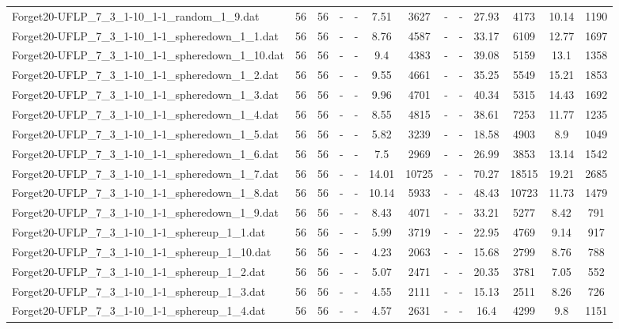 \begin{table}[!ht]
{\begin{tabular}{lcccccccccccc}
Forget20-UFLP\_7\_3\_1-10\_1-1\_random\_1\_9.dat & 56 & 56 &  - &  - & 7.51 & 3627 &  - &  - & 27.93 & 4173 & 10.14 & 1190 \\
Forget20-UFLP\_7\_3\_1-10\_1-1\_spheredown\_1\_1.dat & 56 & 56 &  - &  - & 8.76 & 4587 &  - &  - & 33.17 & 6109 & 12.77 & 1697 \\
Forget20-UFLP\_7\_3\_1-10\_1-1\_spheredown\_1\_10.dat & 56 & 56 &  - &  - & 9.4 & 4383 &  - &  - & 39.08 & 5159 & 13.1 & 1358 \\
Forget20-UFLP\_7\_3\_1-10\_1-1\_spheredown\_1\_2.dat & 56 & 56 &  - &  - & 9.55 & 4661 &  - &  - & 35.25 & 5549 & 15.21 & 1853 \\
Forget20-UFLP\_7\_3\_1-10\_1-1\_spheredown\_1\_3.dat & 56 & 56 &  - &  - & 9.96 & 4701 &  - &  - & 40.34 & 5315 & 14.43 & 1692 \\
Forget20-UFLP\_7\_3\_1-10\_1-1\_spheredown\_1\_4.dat & 56 & 56 &  - &  - & 8.55 & 4815 &  - &  - & 38.61 & 7253 & 11.77 & 1235 \\
Forget20-UFLP\_7\_3\_1-10\_1-1\_spheredown\_1\_5.dat & 56 & 56 &  - &  - & 5.82 & 3239 &  - &  - & 18.58 & 4903 & 8.9 & 1049 \\
Forget20-UFLP\_7\_3\_1-10\_1-1\_spheredown\_1\_6.dat & 56 & 56 &  - &  - & 7.5 & 2969 &  - &  - & 26.99 & 3853 & 13.14 & 1542 \\
Forget20-UFLP\_7\_3\_1-10\_1-1\_spheredown\_1\_7.dat & 56 & 56 &  - &  - & 14.01 & 10725 &  - &  - & 70.27 & 18515 & 19.21 & 2685 \\
Forget20-UFLP\_7\_3\_1-10\_1-1\_spheredown\_1\_8.dat & 56 & 56 &  - &  - & 10.14 & 5933 &  - &  - & 48.43 & 10723 & 11.73 & 1479 \\
Forget20-UFLP\_7\_3\_1-10\_1-1\_spheredown\_1\_9.dat & 56 & 56 &  - &  - & 8.43 & 4071 &  - &  - & 33.21 & 5277 & 8.42 & 791 \\
Forget20-UFLP\_7\_3\_1-10\_1-1\_sphereup\_1\_1.dat & 56 & 56 &  - &  - & 5.99 & 3719 &  - &  - & 22.95 & 4769 & 9.14 & 917 \\
Forget20-UFLP\_7\_3\_1-10\_1-1\_sphereup\_1\_10.dat & 56 & 56 &  - &  - & 4.23 & 2063 &  - &  - & 15.68 & 2799 & 8.76 & 788 \\
Forget20-UFLP\_7\_3\_1-10\_1-1\_sphereup\_1\_2.dat & 56 & 56 &  - &  - & 5.07 & 2471 &  - &  - & 20.35 & 3781 & 7.05 & 552 \\
Forget20-UFLP\_7\_3\_1-10\_1-1\_sphereup\_1\_3.dat & 56 & 56 &  - &  - & 4.55 & 2111 &  - &  - & 15.13 & 2511 & 8.26 & 726 \\
Forget20-UFLP\_7\_3\_1-10\_1-1\_sphereup\_1\_4.dat & 56 & 56 &  - &  - & 4.57 & 2631 &  - &  - & 16.4 & 4299 & 9.8 & 1151 \\

\end{tabular}}
\end{table}

